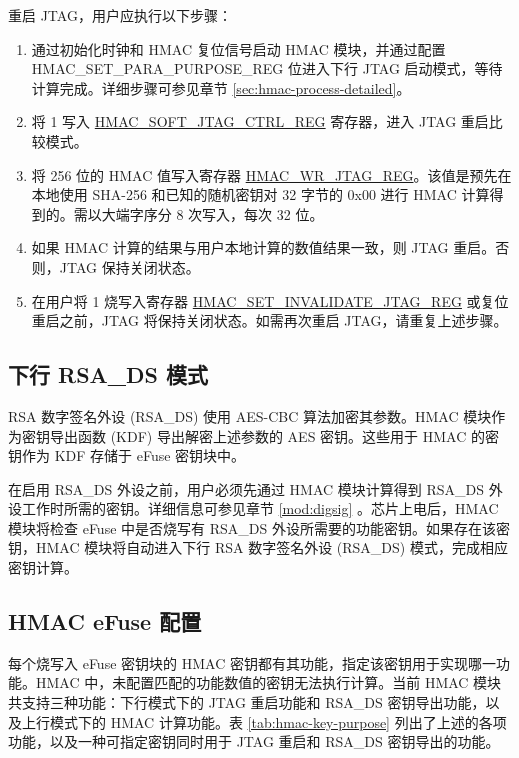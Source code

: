 \documentclass[main\_\_CN.tex]{subfiles}
\begin{document}
重启 JTAG，用户应执行以下步骤：
\begin{enumerate}
    \item 通过初始化时钟和 HMAC 复位信号启动 HMAC 模块，并通过配置 HMAC\_SET\_PARA\_PURPOSE\_REG 位进入下行 JTAG 启动模式，等待计算完成。详细步骤可参见章节 \ref{sec:hmac-process-detailed}。
    \item 将 1 写入 \hyperref[regdesc:HMACSOFTJTAGCTRLREG]{HMAC\_SOFT\_JTAG\_CTRL\_REG} 寄存器，进入 JTAG 重启比较模式。
    \item 将 256 位的 HMAC 值写入寄存器 \hyperref[regdesc:HMACWRJTAGREG]{HMAC\_WR\_JTAG\_REG}。该值是预先在本地使用 SHA-256 和已知的随机密钥对 32 字节的 0x00 进行 HMAC 计算得到的。需以大端字序分 8 次写入，每次 32 位。
    \item 如果 HMAC 计算的结果与用户本地计算的数值结果一致，则 JTAG 重启。否则，JTAG 保持关闭状态。
    \item 在用户将 1 烧写入寄存器 \hyperref[regdesc:HMACSETINVALIDATEJTAGREG]{HMAC\_SET\_INVALIDATE\_JTAG\_REG} 或复位重启之前，JTAG 将保持关闭状态。如需再次重启 JTAG，请重复上述步骤。
    \end{enumerate}


\subsection{下行 RSA\_DS 模式}

RSA 数字签名外设 (RSA\_DS) 使用 AES-CBC 算法加密其参数。HMAC 模块作为密钥导出函数 (KDF) 导出解密上述参数的 AES 密钥。这些用于 HMAC 的密钥作为 KDF 存储于 eFuse 密钥块中。

在启用 RSA\_DS 外设之前，用户必须先通过 HMAC 模块计算得到 RSA\_DS 外设工作时所需的密钥。详细信息可参见章节 \ref{mod:digsig} \textit{}。芯片上电后，HMAC 模块将检查 eFuse 中是否烧写有 RSA\_DS 外设所需要的功能密钥。如果存在该密钥，HMAC 模块将自动进入下行 RSA 数字签名外设 (RSA\_DS) 模式，完成相应密钥计算。

\subsection{HMAC eFuse 配置}
\label{sec:hmac-config-function}

每个烧写入 eFuse 密钥块的 HMAC 密钥都有其功能，指定该密钥用于实现哪一功能。HMAC 中，未配置匹配的功能数值的密钥无法执行计算。当前 HMAC 模块共支持三种功能：下行模式下的 JTAG 重启功能和 RSA\_DS 密钥导出功能，以及上行模式下的 HMAC 计算功能。表 \ref{tab:hmac-key-purpose} 列出了上述的各项功能，以及一种可指定密钥同时用于 JTAG 重启和 RSA\_DS 密钥导出的功能。
\end{document}
